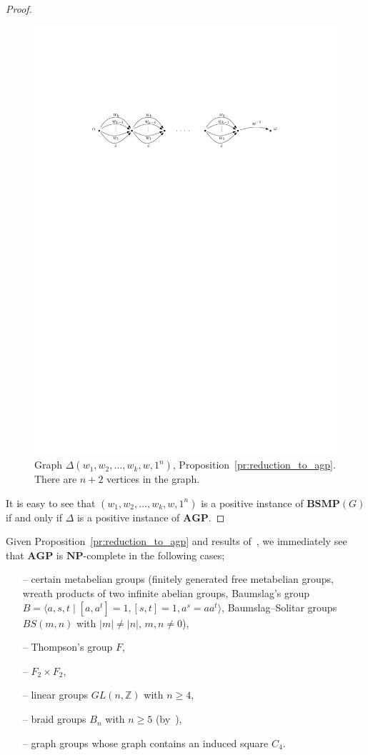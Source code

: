 \documentclass[10pt]{amsart}
\newcommand{\an}{\noindent\color{red} Andrey: }{}
\newcommand{\li}{\noindent\color{blue} Liza: }{}
\theoremstyle{definition}
\def\NP{{\mathbf{NP}}}
\def\BSMP{{\mathbf{BSMP}}}
\def\AGP{{\mathbf{AGP}}}
\begin{document}
\begin{proof}
\begin{figure}[h]
 \centering
 \includegraphics[width=4.5in]{bsmp}
 \caption{Graph $\Delta(w_1,w_2,\ldots,w_k,w,1^n)$, Proposition~\ref{pr:reduction_to_agp}. There are $n+2$ vertices in the graph.}\label{fi:BSMP}
\end{figure}
It is easy to see that $(w_1,w_2,\ldots,w_k,w,1^n)$ is a positive instance of $\BSMP(G)$ if and only if $\Delta$ is a positive instance of $\AGP$.
\end{proof}

Given Proposition~\ref{pr:reduction_to_agp} and results of~\cite{Miasnikov-Nikolaev-Ushakov:2014a}, we immediately see that $\AGP$ is $\NP$-complete in the following cases;
\begin{itemize}
\item[--] certain metabelian groups (finitely generated free metabelian groups, wreath products of two infinite abelian groups, Baumslag's group $B=\langle a,s,t\mid [a,a^t]=1, [s,t]=1, a^s=aa^t\rangle$, Baumslag--Solitar groups $BS(m,n)$ with $|m|\neq |n|$, $m,n\neq 0$),
\item[--] Thompson's group $F$,
\item[--] $F_2\times F_2$,
\item[--] linear groups $GL(n, \mathbb Z)$ with $n\ge 4$,
\item[--] braid groups $B_n$ with $n\ge 5$ (by~\cite{Makanina}),
\item[--] graph groups whose graph contains an induced square $C_4$.
\end{itemize}
\end{document}
